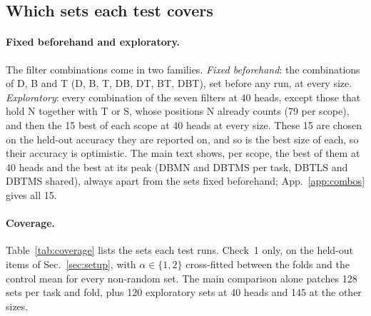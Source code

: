 \documentclass[10pt,a4paper]{article}
\begin{document}
\subsection{Which sets each test covers}\label{sec:coverage}

\paragraph{Fixed beforehand and exploratory.} The filter combinations come in two families. \emph{Fixed beforehand}: the combinations of D, B and T (D, B, T, DB, DT, BT, DBT), set before any run, at every size. \emph{Exploratory}: every combination of the seven filters at 40 heads, except those that hold N together with T or S, whose positions N already counts (79 per scope), and then the 15 best of each scope at 40 heads at every size. These 15 are chosen on the held-out accuracy they are reported on, and so is the best size of each, so their accuracy is optimistic. The main text shows, per scope, the best of them at 40 heads and the best at its peak (DBMN and DBTMS per task, DBTLS and DBTMS shared), always apart from the sets fixed beforehand; App.~\ref{app:combos} gives all 15.

\paragraph{Coverage.} Table~\ref{tab:coverage} lists the sets each test runs. Check~1 only, on the held-out items of Sec.~\ref{sec:setup}, with $\alpha\in\{1,2\}$ cross-fitted between the folds and the control mean for every non-random set. The main comparison alone patches 128 sets per task and fold, plus 120 exploratory sets at 40 heads and 145 at the other sizes.
\end{document}
